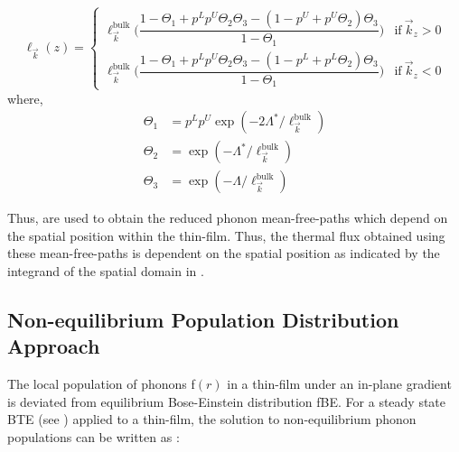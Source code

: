 \begin{equation}
\ell_{\vec{k}}(z)= 
\begin{cases}
\ell_{\vec{k}}^{\textrm{bulk}}\Bigg(\dfrac{1-\Theta_1 + p^L p^U \Theta_2 \Theta_3 - (1-p^U + p^U \Theta_2 ) \Theta_3 }{1-\Theta_1}\Bigg) & \text{if}\: \vec{k}_z >0 \\
\ell_{\vec{k}}^{\textrm{bulk}}\Bigg(\dfrac{1-\Theta_1 + p^L p^U \Theta_2 \Theta_3 - (1-p^L + p^L \Theta_2 ) \Theta_3 }{1-\Theta_1}\Bigg) & \text{if}\: \vec{k}_z <0	
\end{cases}
\label{eq:mfp_ch3}
\end{equation} 
where,
\begin{align}\label{eq:mfp_params_ch3}
	\Theta_1 &= p^L p^U \exp (-2\Lambda^*/\ell_{\vec{k}}^{\textrm{bulk}}) \nonumber \\
	\Theta_2 &= \exp (-\Lambda^*/\ell_{\vec{k}}^{\textrm{bulk}}) \\
	\Theta_3 &= \exp (-\Lambda/\ell_{\vec{k}}^{\textrm{bulk}}) \nonumber
\end{align}

Thus,  are used to obtain the reduced phonon mean-free-paths which depend on the spatial position within the thin-film. Thus, the thermal flux obtained using these mean-free-paths is dependent on the spatial position as indicated by the integrand of the spatial domain in . 

\subsection{Non-equilibrium Population Distribution Approach}
The local population of phonons \gls{f}$(r)$ in a thin-film under an in-plane gradient is deviated from equilibrium Bose-Einstein distribution \gls{fBE}. For a steady state BTE (see ) applied to a thin-film, the solution to non-equilibrium phonon populations can be written as \cite{book_Ziman}:


